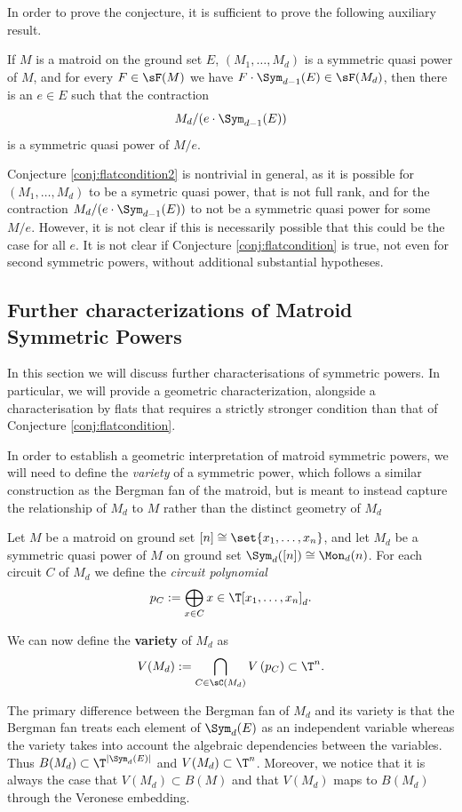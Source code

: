 In order to prove the conjecture, it is sufficient to prove the following auxiliary result.

\begin{conjecture}\label{conj:flatcondition2}
    If $M$ is a matroid on the ground set $E$, $(M_1,\dots,M_d)$ is a symmetric quasi power of $M$, and for every $F\in \sF(M)$ we have $F\cdot \Sym_{d-1}(E)\in \sF(M_d)$, then there is an $e\in E$ such that the contraction
    $$M_d/(e\cdot \Sym_{d-1}(E))$$
    is a symmetric quasi power of $M/e$.
\end{conjecture}

Conjecture \ref{conj:flatcondition2} is nontrivial in general, as it is possible for $(M_1,\dots,M_d)$ to be a symetric quasi power, that is not full rank, and for the contraction $M_d/(e\cdot \Sym_{d-1}(E))$ to not be a symmetric quasi power for some $M/e$. However, it is not clear if this is necessarily possible that this could be the case for all $e$. It is not clear if Conjecture \ref{conj:flatcondition} is true, not even for second symmetric powers,  without additional substantial hypotheses.


\subsection{Further characterizations of Matroid Symmetric Powers}\label{subsec:sympowCharacterizations}

In this section we will discuss further characterisations of symmetric powers. In particular, we will provide a geometric characterization, alongside a characterisation by flats that requires a strictly stronger condition than that of Conjecture \ref{conj:flatcondition}.

In order to establish a geometric interpretation of matroid symmetric powers, we will need to define the \textit{variety} of a symmetric power, which follows a similar construction as the Bergman fan of the matroid, but is meant to instead capture the relationship of $M_d$ to $M$ rather than the distinct geometry of $M_d$

\begin{definition}\label{def:matroidVariety}
Let $M$ be a matroid on ground set $[n]\cong\set{x_1,\dots,x_n}$, and let $M_d$ be a symmetric quasi power of $M$ on ground set $\Sym_{d}([n])\cong \Mon_d(n)$. For each circuit $C$ of $M_d$ we define the \textit{circuit polynomial}
    $$p_C := \bigoplus_{x\in C} x\in \T[x_1,\dots,x_n]_d.$$

We can now define the \textbf{variety} of $M_d$ as
$$V(M_d) : = \bigcap_{C\in \sC(M_d)} V\left(p_C\right)\subset \T^n.$$
\end{definition}
The primary difference between the Bergman fan of $M_d$ and its variety is that the Bergman fan treats each element of $\Sym_d(E)$ as an independent variable whereas the variety takes into account the algebraic dependencies between the variables. Thus $B(M_d)\subset\T^{|\Sym_d(E)|}$ and $V(M_d)\subset \T^n$. Moreover, we notice that it is always the case that $V(M_d)\subset B(M)$ and that $V(M_d)$ maps to $B(M_d)$ through the Veronese embedding.



